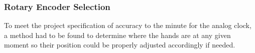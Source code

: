 \documentclass[11pt]{article}
\begin{document}


\subsubsection{Rotary Encoder Selection}
\label{PositionDesign}

To meet the project specification of accuracy to the minute for the analog clock, a method had to be found to determine where the hands are at any given moment so their position could be properly adjusted accordingly if needed.

\end{document}
